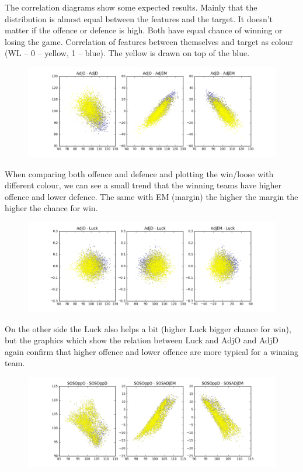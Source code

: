 \documentclass[
10pt, %
a4paper, %
oneside, %
headinclude,footinclude, %
BCOR5mm, %
]{scrartcl}
\begin{document}
The correlation diagrams show some expected results. Mainly that the distribution is almost equal between the features and the target. It doesn’t matter if the offence or defence is high. Both have equal chance of winning or losing the game. Correlation of features between themselves and target as colour (WL – 0 – yellow, 1 – blue). The yellow is drawn on top of the blue.
\begin{figure}[H]
  \centering
\includegraphics[width=\textwidth]{Correlation2}
\end{figure}
When comparing both offence and defence and plotting the win/loose with different colour, we can see a small trend that the winning teams have higher offence and lower defence. The same with EM (margin) the higher the margin the higher the chance for win.
\begin{figure}[H]
  \centering
\includegraphics[width=\textwidth]{Correlation3}
\end{figure}
On the other side the Luck also helps a bit (higher Luck bigger chance for win), but the graphics which show the relation between Luck and AdjO and AdjD again confirm that higher offence and lower offence are more typical for a winning team.
\begin{figure}[H]
  \centering
\includegraphics[width=\textwidth]{Correlation4}
\end{figure}
\end{document}
